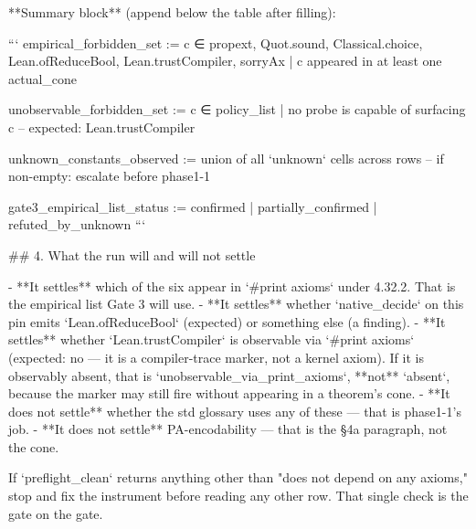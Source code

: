 **Summary block** (append below the table after filling):

```
empirical_forbidden_set :=
  { c ∈ {propext, Quot.sound, Classical.choice,
         Lean.ofReduceBool, Lean.trustCompiler, sorryAx}
    | c appeared in at least one actual_cone }

unobservable_forbidden_set :=
  { c ∈ policy_list | no probe is capable of surfacing c }
  -- expected: {Lean.trustCompiler}

unknown_constants_observed :=
  union of all `unknown` cells across rows
  -- if non-empty: escalate before phase1-1

gate3_empirical_list_status :=
  confirmed | partially_confirmed | refuted_by_unknown
```

## 4. What the run will and will not settle

- **It settles** which of the six appear in `#print axioms` under 4.32.2. That is the empirical list Gate 3 will use.
- **It settles** whether `native_decide` on this pin emits `Lean.ofReduceBool` (expected) or something else (a finding).
- **It settles** whether `Lean.trustCompiler` is observable via `#print axioms` (expected: no — it is a compiler-trace marker, not a kernel axiom). If it is observably absent, that is `unobservable_via_print_axioms`, **not** `absent`, because the marker may still fire without appearing in a theorem's cone.
- **It does not settle** whether the std glossary uses any of these — that is phase1-1's job.
- **It does not settle** PA-encodability — that is the §4a paragraph, not the cone.

If `preflight_clean` returns anything other than "does not depend on any axioms," stop and fix the instrument before reading any other row. That single check is the gate on the gate.
